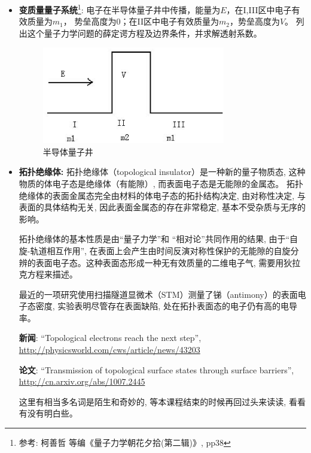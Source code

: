 \begin{itemize}

\item \textbf{变质量量子系统}\footnote{参考: 柯善哲 等编《量子力学朝花夕拾(第二辑)》, pp38 }:
电子在半导体量子井中传播，能量为$E$，在I,III区中电子有效质量为$m_1$，
势垒高度为$0$；在II区中电子有效质量为$m_2$，势垒高度为$V$。
列出这个量子力学问题的薛定谔方程及边界条件，并求解透射系数。

\begin{figure}[h]
\begin{center}
\includegraphics[clip,width=8cm]{1DProblem/quantum_well.ps}
\caption{半导体量子井}
\end{center}
\end{figure}



\item \textbf{拓扑绝缘体:} 拓扑绝缘体（topological insulator）是一种新的量子物质态,
这种物质的体电子态是绝缘体（有能隙）, 而表面电子态是无能隙的金属态。
拓扑绝缘体的表面金属态完全由材料的体电子态的拓扑结构决定,
由对称性决定, 与表面的具体结构无关, 因此表面金属态的存在非常稳定,
基本不受杂质与无序的影响。

拓扑绝缘体的基本性质是由``量子力学''和 ``相对论''共同作用的结果,
由于``自旋-轨道相互作用'',
在表面上会产生由时间反演对称性保护的无能隙的自旋分辨的表面电子态。这种表面态形成一种无有效质量的二维电子气,
需要用狄拉克方程来描述。

最近的一项研究使用扫描隧道显微术（STM）测量了锑（antimony）的表面电子态密度,
实验表明尽管存在表面缺陷, 处在拓扑表面态的电子仍有高的电导率。



\textbf{新闻}: ``Topological electrons reach the next step'',
\url{http://physicsworld.com/cws/article/news/43203}

\textbf{论文}: ``Transmission of topological surface states through
surface barriers'', \url{http://cn.arxiv.org/abs/1007.2445}


这里有相当多名词是陌生和奇妙的, 等本课程结束的时候再回过头来读读,
看看有没有明白些。



\end{itemize}
